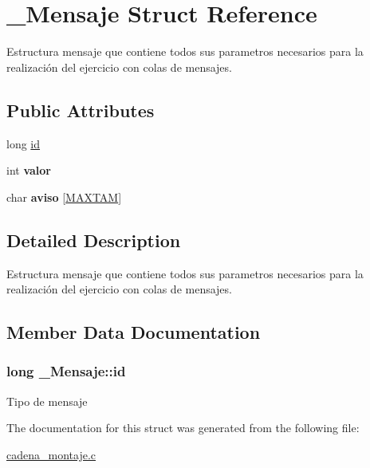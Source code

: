 \hypertarget{struct__Mensaje}{}\section{\+\_\+\+Mensaje Struct Reference}
\label{struct__Mensaje}


Estructura mensaje que contiene todos sus parametros necesarios para la realización del ejercicio con colas de mensajes.  


\subsection*{Public Attributes}
\begin{DoxyCompactItemize}
\item 
long \hyperlink{struct__Mensaje_a216a370cde3eae04df6a81fea5bef338}{id}
\item 
int {\bfseries valor}\hypertarget{struct__Mensaje_a38b34a25ffa462aaf44bb09a1da1e430}{}\label{struct__Mensaje_a38b34a25ffa462aaf44bb09a1da1e430}

\item 
char {\bfseries aviso} \mbox{[}\hyperlink{cadena__montaje_8c_a0e68c4ad6b4b3a349afa80ebbbdffb13}{M\+A\+X\+T\+AM}\mbox{]}\hypertarget{struct__Mensaje_a4187bae10cdeba06a6a99d6d57e85a54}{}\label{struct__Mensaje_a4187bae10cdeba06a6a99d6d57e85a54}

\end{DoxyCompactItemize}


\subsection{Detailed Description}
Estructura mensaje que contiene todos sus parametros necesarios para la realización del ejercicio con colas de mensajes. 

\subsection{Member Data Documentation}
\subsubsection[{\texorpdfstring{id}{id}}]{\setlength{\rightskip}{0pt plus 5cm}long \+\_\+\+Mensaje\+::id}\hypertarget{struct__Mensaje_a216a370cde3eae04df6a81fea5bef338}{}\label{struct__Mensaje_a216a370cde3eae04df6a81fea5bef338}
Tipo de mensaje 

The documentation for this struct was generated from the following file\+:\begin{DoxyCompactItemize}
\item 
\hyperlink{cadena__montaje_8c}{cadena\+\_\+montaje.\+c}\end{DoxyCompactItemize}
